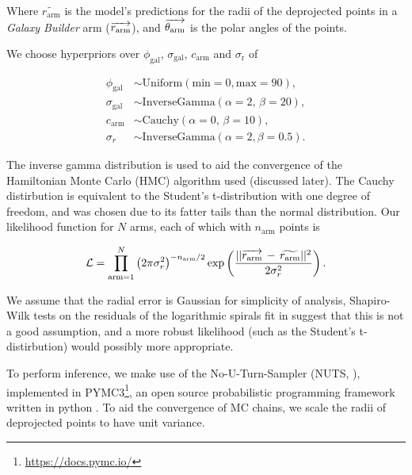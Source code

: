 Where $\widetilde{r_\mathrm{arm}}$ is the model's predictions for the radii of the deprojected points in a \textit{Galaxy Builder} arm ($\overrightarrow{r_\mathrm{arm}}$), and $\overrightarrow{\theta_\mathrm{arm}}$ is the polar angles of the points.

We choose hyperpriors over $\phi_\mathrm{gal}$, $\sigma_\mathrm{gal}$, $c_\mathrm{arm}$ and $\sigma_\mathrm{r}$ of

\begin{align}
  \phi_\mathrm{gal} &\sim \mathrm{Uniform}(\mathrm{min}=0, \mathrm{max}=90),\\
  \sigma_\mathrm{gal} &\sim \mathrm{InverseGamma}(\alpha=2,\,\beta=20),\\
  c_\mathrm{arm} &\sim \mathrm{Cauchy}(\alpha=0,\,\beta=10),\\
  \sigma_r &\sim \mathrm{InverseGamma}(\alpha=2, \beta=0.5).
\end{align}

The inverse gamma distribution is used to aid the convergence of the Hamiltonian Monte Carlo (HMC) algorithm used (discussed later). The Cauchy distirbution is equivalent to the Student's t-distribution with one degree of freedom, and was chosen due to its fatter tails than the normal distribution. Our likelihood function for $N$ arms, each of which with $n_\mathrm{arm}$ points is

\begin{equation}
  \mathcal{L} = \prod_{\mathrm{arm}=1}^{N}\left(2\pi\sigma_r^2\right)^{-n_\mathrm{arm}/2}
  \exp\left(\frac{||\overrightarrow{r_\mathrm{arm}}\,-\,\widetilde{r_\mathrm{arm}}||^2}{2\sigma_r^2}\right).
\end{equation}

We assume that the radial error is Gaussian for simplicity of analysis, Shapiro-Wilk tests on the residuals of the logarithmic spirals fit in {\Lingard} suggest that this is not a good assumption, and a more robust likelihood (such as the Student's t-distirbution) would possibly more appropriate.

To perform inference, we make use of the No-U-Turn-Sampler (NUTS, \citealt{2011arXiv1111.4246H}), implemented in PYMC3\footnote{\url{https://docs.pymc.io/}}, an open source probabilistic programming framework written in python \citep{pymc3_paper}. To aid the convergence of MC chains, we scale the radii of deprojected points to have unit variance.
